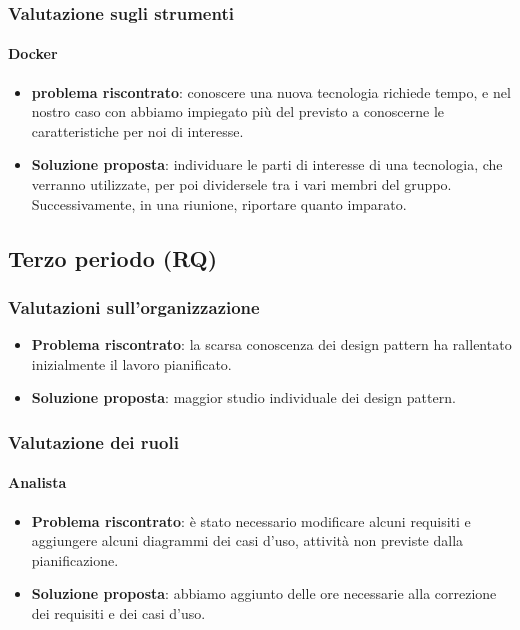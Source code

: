     \subsubsection{Valutazione sugli strumenti}

        \paragraph{Docker}
            \begin{itemize}
                \item \textbf{problema riscontrato}: conoscere una nuova tecnologia richiede tempo, e nel nostro caso con  abbiamo impiegato più del previsto a conoscerne le caratteristiche per noi di interesse.
                \item \textbf{Soluzione proposta}: individuare le parti di interesse di una tecnologia, che verranno utilizzate, per poi dividersele tra i vari membri del gruppo. Successivamente, in una riunione, riportare quanto imparato.
            \end{itemize}


    \subsection{Terzo periodo (RQ)}\label{valutazioni per il miglioramento:RQ}

    \subsubsection{Valutazioni sull'organizzazione}
        \begin{itemize}
            \item \textbf{Problema riscontrato}: la scarsa conoscenza dei design pattern ha rallentato inizialmente il lavoro pianificato.
            \item \textbf{Soluzione proposta}: maggior studio individuale dei design pattern.
        \end{itemize}

    \subsubsection{Valutazione dei ruoli}

        \paragraph{Analista}
            \begin{itemize}
                \item \textbf{Problema riscontrato}: è stato necessario modificare alcuni requisiti e aggiungere alcuni diagrammi dei casi d'uso, attività non previste dalla pianificazione.
                \item \textbf{Soluzione proposta}: abbiamo aggiunto delle ore necessarie alla correzione dei requisiti e dei casi d'uso.
            \end{itemize}

